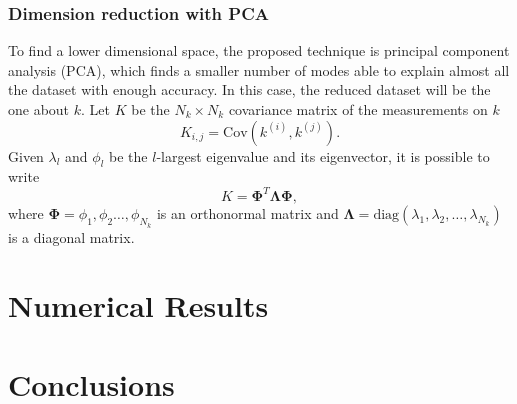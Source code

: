 \documentclass[11pt,a4paper]{article}
\begin{document}
\subsubsection{Dimension reduction with PCA}
To find a lower dimensional space, the proposed technique is principal component analysis (PCA), which finds a smaller number of modes able to explain almost all the dataset with enough accuracy. In this case, the reduced dataset will be the one about \(k\).
Let \(K\) be the \(N_k\times N_k\) covariance matrix of the measurements on \(k\)
\[
   K_{i,j} = \text{Cov}(k^{(i)}, k^{(j)}).
\]
Given \(\lambda_l\) and \(\phi_l\) be the \(l\)-largest eigenvalue and its eigenvector, it is possible to write 
\[
    K = \bm{\Phi}^T\bm{\Lambda}\bm{\Phi},
\]
where \(\bm{\Phi} = \phi_1, \phi_2 \ldots, \phi_{N_k}\) is an orthonormal matrix and \(\bm{\Lambda} = \text{diag}(\lambda_1, \lambda_2, \ldots, \lambda_{N_k})\) is a diagonal matrix. 
 \section{Numerical Results}
\section{Conclusions}

\end{document}
